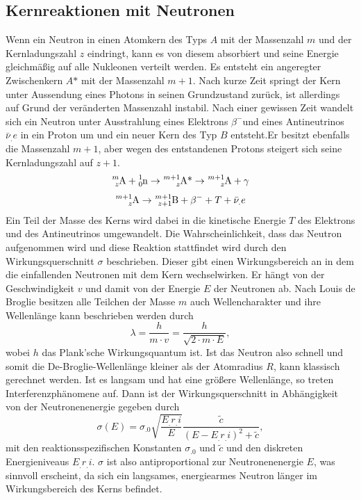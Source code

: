 \subsection{Kernreaktionen mit Neutronen}
\label{sec:Reaktion}
Wenn ein Neutron in einen Atomkern des Typs $A$ mit der Massenzahl $m$
und der Kernladungszahl $z$ eindringt, kann es von diesem absorbiert und seine Energie gleichmäßig auf alle Nukleonen verteilt werden. Es entsteht ein angeregter Zwischenkern $A\text{*}$ mit der Massenzahl $m+1$.\newline
Nach kurze Zeit springt der Kern unter Aussendung eines Photons in seinen Grundzustand zurück, ist allerdings auf Grund der veränderten Massenzahl  instabil. Nach einer gewissen Zeit wandelt sich ein Neutron unter Ausstrahlung eines Elektrons $\beta^-$und eines Antineutrinos $\bar{\nu}_.e$ in ein Proton um und ein neuer Kern des Typ $B$ entsteht.\newline Er besitzt ebenfalls die Massenzahl $m+1$, aber wegen des entstandenen Protons steigert sich seine Kernladungszahl auf $z+1$.
\begin{equation}
\ce{^{m}_{z}A} + \ce{^{1}_{0}n} \rightarrow \ce{^{m+1}_{z}A\text{*}}\rightarrow \ce{^{m+1}_{z}A}+\gamma \label{eq:Anregung}
\end{equation}
\begin{equation}
\ce{^{m+1}_{z}A} \rightarrow \ce{^{m+1}_{z+1}B} + \beta^-+ T + \bar{\nu}_.e\label{eq:Zerfall}
\end{equation}
Ein Teil der Masse des Kerns wird dabei in die kinetische Energie $T$ des Elektrons und des Antineutrinos umgewandelt.\newline
Die Wahrscheinlichkeit, dass das Neutron aufgenommen wird und diese Reaktion stattfindet wird durch den Wirkungsquerschnitt $\sigma$ beschrieben. Dieser gibt einen Wirkungsbereich an in dem die einfallenden Neutronen mit dem Kern wechselwirken.
Er hängt von der Geschwindigkeit $v$ und damit von der Energie $E$ der Neutronen ab.
Nach Louis de Broglie besitzen alle Teilchen der Masse $m$ auch Wellencharakter und ihre Wellenlänge kann beschrieben werden durch
\[
\lambda=\frac{h}{m\cdot v}=\frac{h}{\sqrt{2\cdot m\cdot E}},
\]
wobei $h$ das Plank'sche Wirkungsquantum ist.
Ist das Neutron also schnell und somit die De-Broglie-Wellenlänge kleiner als der Atomradius $R$, kann klassisch gerechnet werden. Ist es langsam und hat eine größere Wellenlänge, so treten Interferenzphänomene auf.
Dann ist der Wirkungsquerschnitt in Abhängigkeit von der Neutronenenergie gegeben durch
\begin{equation}
\sigma(E) = \sigma_.0\sqrt{\frac{E_.{r_.i}}{E}}\frac{\tilde{c}}{\left(E-E_.{r_.i}\right)^2+\tilde{c}},
\end{equation}
mit den reaktionsspezifischen Konstanten $\sigma_.0$ und $\tilde{c}$
und den diskreten Energieniveaus $E_.{r_.i}$.
$\sigma$ ist also antiproportional zur Neutronenenergie $E$, was sinnvoll erscheint, da sich ein langsames, energiearmes Neutron länger im Wirkungsbereich des Kerns befindet.

